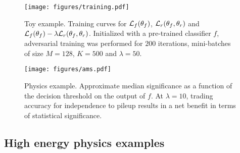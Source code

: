 \documentclass{article}
\theoremstyle{plain}
\begin{document}
\begin{figure}
\centering
\begin{minipage}{.46\linewidth}
    \centering
        \texttt{[image: figures/training.pdf]}\vspace{-1em}
        \caption{Toy example. Training curves for ${\cal L}_f(\theta_f)$, ${\cal L}_r(\theta_f, \theta_r)$
                 and ${\cal L}_f(\theta_f) - \lambda {\cal L}_r(\theta_f, \theta_r)$.
                 Initialized with a pre-trained classifier $f$, adversarial training was performed for $200$ iterations, mini-batches of size $M=128$, $K=500$ and $\lambda=50$.}
        \label{fig:toy-training}
\end{minipage}
\hspace{.05\linewidth}
\begin{minipage}{.46\linewidth}
    \centering
        \texttt{[image: figures/ams.pdf]}\vspace{-1em}
        \caption{Physics example. Approximate median significance as a function of the decision threshold
                 on the output of $f$. At $\lambda=10$, trading
                 accuracy for independence to pileup
                 results in a net benefit in terms of statistical significance.}
        \label{fig:physics-ams}
\end{minipage}
\end{figure}

\subsection{High energy physics examples}
\label{sec:hep}
\end{document}
